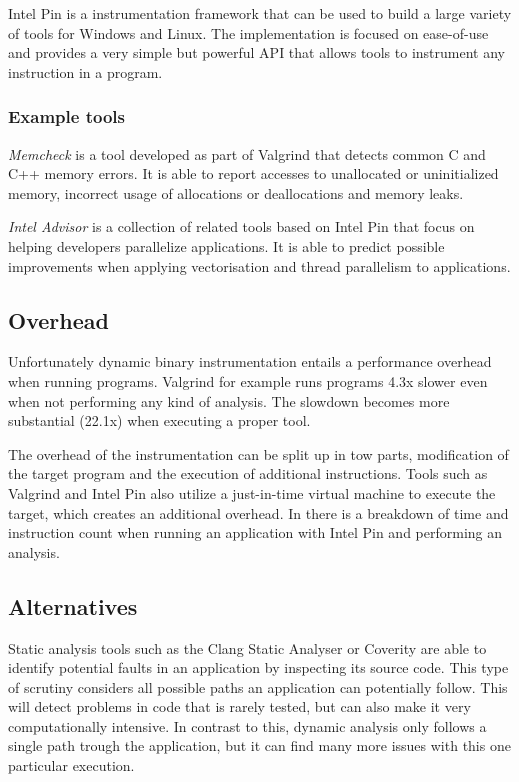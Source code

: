 Intel Pin \cite{pin} is a instrumentation framework that can be used to build a large variety of tools for Windows and Linux. The implementation is focused on ease-of-use and provides a very simple but powerful API that allows tools to instrument any instruction in a program.

\subsubsection{Example tools}

\emph{Memcheck} \cite{memcheck} is a tool developed as part of Valgrind that detects common C and C++ memory errors. It is able to report accesses to unallocated or uninitialized memory, incorrect usage of allocations or deallocations and memory leaks.

\emph{Intel Advisor} \cite{inteladvisor} is a collection of related tools based on Intel Pin that focus on helping developers parallelize applications. It is able to predict possible improvements when applying vectorisation and thread parallelism to applications.

\subsection{Overhead}

Unfortunately dynamic binary instrumentation entails a performance overhead when running programs. Valgrind for example runs programs 4.3x slower \cite{valgrind} even when not performing any kind of analysis. The slowdown becomes more substantial (22.1x) when executing a proper tool.

The overhead of the instrumentation can be split up in tow parts, modification of the target program and the execution of additional instructions. Tools such as Valgrind and Intel Pin also utilize a just-in-time virtual machine to execute the target, which creates an additional overhead. In \cite{instoverhead} there is a breakdown of time and instruction count when running an application with Intel Pin and performing an analysis.

\subsection{Alternatives}

Static analysis tools such as the Clang Static Analyser \cite{clang} or Coverity \cite{coverity} are able to identify potential faults in an application by inspecting its source code. This type of scrutiny considers all possible paths an application can potentially follow. This will detect problems in code that is rarely tested, but can also make it very computationally intensive. In contrast to this, dynamic analysis only follows a single path trough the application, but it can find many more issues with this one particular execution.

